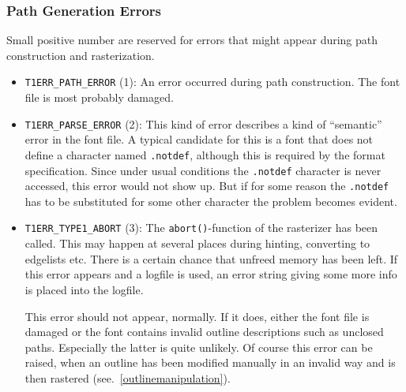 \subsubsection{Path Generation Errors}
Small positive number are reserved for errors that might appear during path
construction and rasterization. 
\begin{itemize}
\item \verb+T1ERR_PATH_ERROR+ (1): An error occurred during path
  construction. The font file is most probably damaged.
\item \verb+T1ERR_PARSE_ERROR+ (2): This kind of error describes a kind of
  ``semantic'' error in the font file. A typical candidate for this is a font
  that does not define a character named \verb+.notdef+, although this is
  required by the format specification. Since under usual conditions the
  \verb+.notdef+ character is never accessed, this error would not show
  up. But if for some reason the \verb+.notdef+ has to be substituted for some
  other character the problem becomes evident.
\item \verb+T1ERR_TYPE1_ABORT+ (3): The \verb+abort()+-function of the
  rasterizer has been called. This may happen at several places during
  hinting, converting to edgelists etc. There is a certain chance that
  unfreed memory has been left. If this error appears and a logfile is used,
  an error string giving some more info is placed into the logfile.
  
  This error should not appear, normally. If it does, either the font file is
  damaged or the font contains invalid outline descriptions such as unclosed
  paths. Especially the latter is quite unlikely. Of course this error can be
  raised, when an outline has been modified manually in an invalid way and is
  then rastered (see.~\ref{outlinemanipulation}).
\end{itemize}

